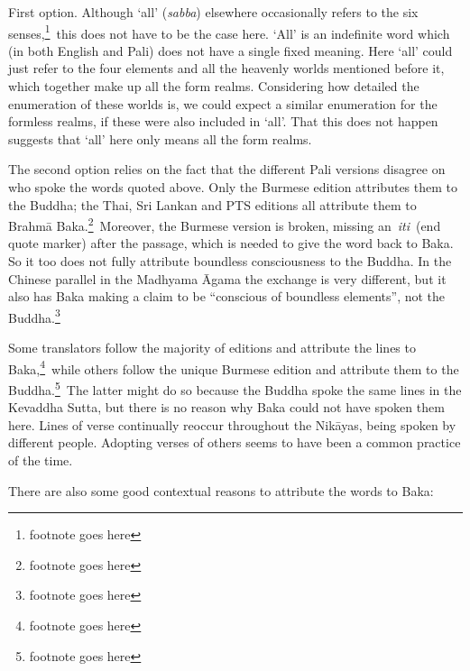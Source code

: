 \documentclass[10pt, openany]{book}
\begin{document}
First option. Although ‘all’ (\textit{sabba}) elsewhere occasionally refers to the six senses,\footnote{footnote goes here} this does not have to be the case here. ‘All’ is an indefinite word which (in both English and Pali) does not have a single fixed meaning. Here ‘all’ could just refer to the four elements and all the heavenly worlds mentioned before it, which together make up all the form realms. Considering how detailed the enumeration of these worlds is, we could expect a similar enumeration for the formless realms, if these were also included in ‘all’. That this does not happen suggests that ‘all’ here only means all the form realms.


The second option relies on the fact that the different Pali versions disagree on who spoke the words quoted above. Only the Burmese edition attributes them to the Buddha; the Thai, Sri Lankan and PTS editions all attribute them to Brahmā Baka.\footnote{footnote goes here} Moreover, the Burmese version is broken, missing an \textit{iti} (end quote marker) after the passage, which is needed to give the word back to Baka. So it too does not fully attribute boundless consciousness to the Buddha. In the Chinese parallel in the Madhyama Āgama the exchange is very different, but it also has Baka making a claim to be “conscious of boundless elements”, not the Buddha.\footnote{footnote goes here}


Some translators follow the majority of editions and attribute the lines to Baka,\footnote{footnote goes here} while others follow the unique Burmese edition and attribute them to the Buddha.\footnote{footnote goes here} The latter might do so because the Buddha spoke the same lines in the Kevaddha Sutta, but there is no reason why Baka could not have spoken them here. Lines of verse continually reoccur throughout the Nikāyas, being spoken by different people. Adopting verses of others seems to have been a common practice of the time.


There are also some good contextual reasons to attribute the words to Baka:
\end{document}
